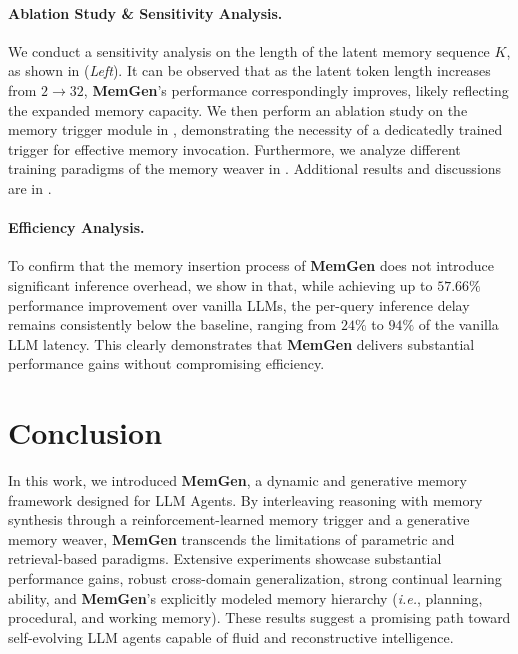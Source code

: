 \documentclass[]{fairmeta}
\newcommand{\ourmethod}{{\fontfamily{lmtt}\selectfont \textbf{MemGen}}\xspace}
\begin{document}
\vspace{-1em}
\paragraph{Ablation Study \& Sensitivity Analysis.} We conduct a sensitivity analysis on the length of the latent memory sequence $K$, as shown in  (\textit{Left}). It can be observed that as the latent token length increases from $2\rightarrow32$, \ourmethod’s performance correspondingly improves, likely reflecting the expanded memory capacity.
 We then perform an ablation study on the memory trigger module in , demonstrating the necessity of a dedicatedly trained trigger for effective memory invocation. Furthermore, we analyze different training paradigms of the memory weaver in . Additional results and discussions are in .

\vspace{-0.8em}
\paragraph{Efficiency Analysis.} To confirm that the memory insertion process of \ourmethod does not introduce significant inference overhead, we show in  that, while achieving up to $57.66\%$ performance improvement over vanilla LLMs, the per-query inference delay remains consistently below the baseline, ranging from $24\%$ to $94\%$ of the vanilla LLM latency. This clearly demonstrates that \ourmethod delivers substantial performance gains without compromising efficiency.






\vspace{-0.4em}
\section{Conclusion}
\vspace{-0.8em}
In this work, we introduced \ourmethod, a dynamic and generative memory framework designed for LLM Agents. By interleaving reasoning with memory synthesis through a reinforcement-learned memory trigger and a generative memory weaver, \ourmethod transcends the limitations of parametric and retrieval-based paradigms. Extensive experiments showcase substantial performance gains, robust cross-domain generalization, strong continual learning ability, and \ourmethod's explicitly modeled memory hierarchy (\textit{i.e.}, planning, procedural, and working memory). These results suggest a promising path toward self-evolving LLM agents capable of fluid and reconstructive intelligence. 
\end{document}

